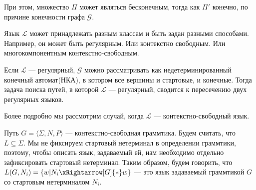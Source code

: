При этом, множество $\Pi$ может являться бесконечным, тогда как $\Pi'$ конечно, по причине конечности графа $\mathcal{G}$.

Язык $\mathcal{L}$ может принадлежать разным классам и быть задан разными способами.
Например, он может быть регулярным.
Или контекстно свободным.
Или многокомпонентным контекстно-свободным.

Если $\mathcal{L}$ --- регулярный, $\mathcal{G}$ можно рассматривать как недетерминированный конечный автомат(НКА), в котором все вершины и стартовые, и конечные.
Тогда задача поиска путей, в которой $\mathcal{L}$ --- регулярный, сводится к пересечению двух регулярных языков.

Более подробно мы рассмотрим случай, когда $\mathcal{L}$ --- контекстно-свободный язык.

Путь $G = \langle \Sigma, N, P \rangle$ --- контекстно-свободная граммтика.
Будем считать, что $L \subseteq \Sigma$.
Мы не фиксируем стартовый нетерминал в определении граммтики, поэтому, чтобы описать язык, задаваемый ей, нам необходимо отдельно зафиксировать стартовый нетерминал.
Таким образом, будем говорить, что $L(G,N_i) = \{ w | N_i \xRightarrow[G]{*} w  \}$ --- это язык задаваемый граммтикой $G$ со стартовым нетерминалом $N_i$.

